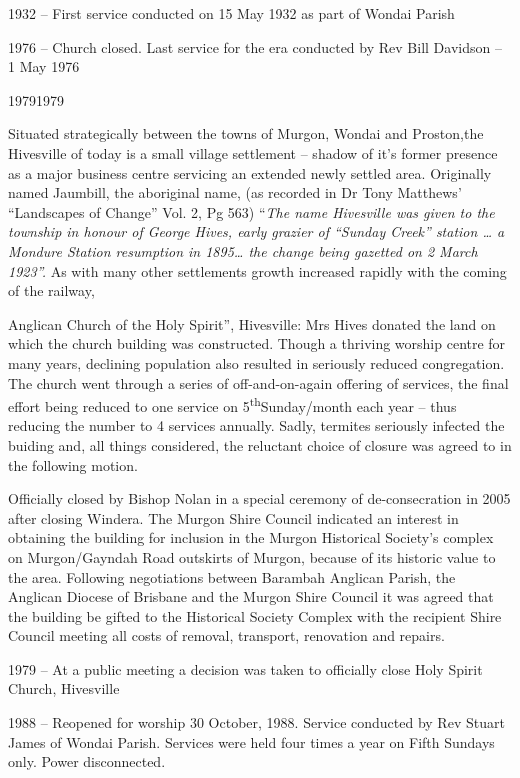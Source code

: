 1932 -- First service conducted on 15 May 1932 as part of Wondai Parish

1976 -- Church closed. Last service for the era conducted by Rev Bill Davidson -- 1 May 1976

19791979

Situated strategically between the towns of Murgon, Wondai and Proston,the Hivesville of today is a small village settlement -- shadow of it's former presence as a major business centre servicing an extended newly settled area. Originally named Jaumbill, the aboriginal name, (as recorded in Dr Tony Matthews' ``Landscapes of Change'' Vol. 2, Pg 563) ``\emph{The name Hivesville was given to the township in honour of George Hives, early grazier of ``Sunday Creek'' station \ldots{} a Mondure Station resumption in 1895\ldots{} the change being gazetted on 2 March 1923''.} As with many other settlements growth increased rapidly with the coming of the railway,

Anglican Church of the Holy Spirit'', Hivesville: Mrs Hives donated the land on which the church building was constructed. Though a thriving worship centre for many years, declining population also resulted in seriously reduced congregation. The church went through a series of off-and-on-again offering of services, the final effort being reduced to one service on 5\textsuperscript{th}Sunday/month each year -- thus reducing the number to 4 services annually. Sadly, termites seriously infected the buiding and, all things considered, the reluctant choice of closure was agreed to in the following motion.

Officially closed by Bishop Nolan in a special ceremony of de-consecration in 2005 after closing Windera. The Murgon Shire Council indicated an interest in obtaining the building for inclusion in the Murgon Historical Society's complex on Murgon/Gayndah Road outskirts of Murgon, because of its historic value to the area. Following negotiations between Barambah Anglican Parish, the Anglican Diocese of Brisbane and the Murgon Shire Council it was agreed that the building be gifted to the Historical Society Complex with the recipient Shire Council meeting all costs of removal, transport, renovation and repairs.

1979 -- At a public meeting a decision was taken to officially close Holy Spirit Church, Hivesville

1988 -- Reopened for worship 30 October, 1988. Service conducted by Rev Stuart James of Wondai Parish. Services were held four times a year on Fifth Sundays only. Power disconnected.

